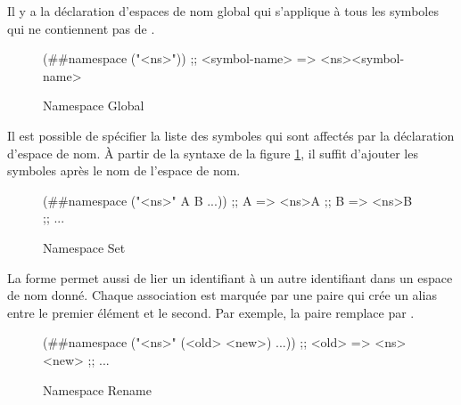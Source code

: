 Il y a la déclaration d'espaces de nom global qui s'applique à tous les
symboles qui ne contiennent pas de \lstcode{#}. \\
\begin{figure}[ht]
  \centering
  \begin{mplisting}{0.6}
(##namespace ("<ns>"))
;; <symbol-name> => <ns><symbol-name>
\end{mplisting}
  \caption{Namespace Global}
  \label{fig:forms->namespace-global}
\end{figure}

Il est possible de spécifier la liste des symboles qui sont affectés par la
déclaration d'espace de nom. À partir de la syntaxe de la figure
\ref{fig:forms->namespace-global}, il suffit d'ajouter les symboles après le nom
de l'espace de nom.\\
\begin{figure}[ht]
  \centering
  \fontsize{12}{10}
  \begin{mplisting}{0.6}
(##namespace ("<ns>" A B ...))
;; A => <ns>A
;; B => <ns>B
;; ...
\end{mplisting}
  \caption{Namespace Set}
  \label{fig:forms->namespace-set}
\end{figure}

La forme  permet aussi de lier un identifiant à un
autre identifiant dans un espace de nom donné. Chaque association est marquée
par une paire qui crée un alias entre le premier élément et le second. Par exemple,
la paire  remplace  par .\\
\begin{figure}[ht]
  \centering
  \fontsize{12}{10}
  \begin{mplisting}{0.6}
(##namespace ("<ns>" (<old> <new>) ...))
;; <old> => <ns><new>
;; ...
\end{mplisting}
  \caption{Namespace Rename}
  \label{fig:forms->namespace-rename}
\end{figure}



